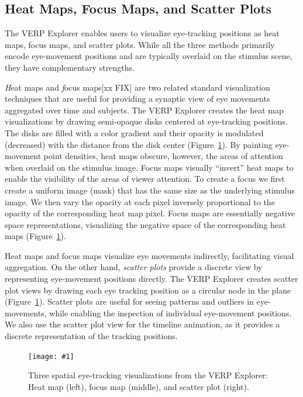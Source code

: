 \documentclass{sigchi}
\newcommand{\insertpicture}[2]{\begin{center}\texttt{[image: \#1]}\end{center}}
\begin{document}
\subsection{Heat Maps, Focus Maps, and Scatter Plots} 
The VERP Explorer enables users to visualize eye-tracking positions 
as heat maps, focus maps, and scatter plots. While all the three
methods primarily encode eye-movement positions and are typically 
overlaid on the stimulus scene, they have complementary strengths.  

{\emph Heat maps} and {\emph focus maps}[xx FIX] are two related standard 
visualization techniques that are useful for providing a synaptic view of 
eye movements aggregated over time and subjects. The VERP Explorer creates 
the heat map visualizations by drawing semi-opaque disks centered at 
eye-tracking positions. The disks are filled with a color gradient and 
their opacity is modulated (decreased) with the distance from the disk 
center (Figure~\ref{fig:spatial}). By painting eye-movement point densities, 
heat maps obscure, however, the areas of attention when overlaid on the 
stimulus image. Focus maps visually “invert” heat maps to enable the  
visibility of the areas of viewer attention. To create a focus we  
first create a uniform
image (mask) that has the same size as the underlying stimulus image. We 
then vary the opacity at each pixel inversely proportional to the opacity 
of the corresponding heat map pixel. Focus maps are essentially negative 
space representations, visualizing the negative space of the corresponding 
heat maps (Figure~\ref{fig:spatial}). 

Heat maps and focus maps visualize eye movements indirectly, facilitating
visual aggregation. On the other hand, {\em scatter plots} provide a
discrete view by representing eye-movement positions directly. The VERP
Explorer creates scatter plot views by drawing each eye tracking position
as a circular node in the plane (Figure~\ref{fig:spatial}). Scatter plots 
are useful for
seeing patterns and outliers in eye-movements, while enabling the
inspection of individual eye-movement positions. We also use the scatter
plot view for the timeline animation, as it provides a  discrete
representation of the tracking positions.

\begin{figure}
	\insertpicture{figures/spatial.pdf}{0.9}
	\caption{ Three spatial eye-tracking visualizations from the VERP
		Explorer: Heat map (left), focus map (middle), and scatter plot
		(right). \label{fig:spatial} }

\end{figure}
\end{document}
